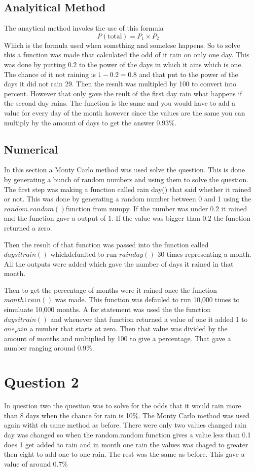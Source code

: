 \documentclass[twocolumn]{revtex4}
\begin{document}
\subsection{Analyitical Method}
The anaytical method involes the use of this formula 
$$P(\textrm{total}) = P_{\textrm{1}} \times P_{\textrm{2}} $$
Which is the formula used when something and somelese happens. 
So to solve this  a function was made that calculated the odd of it rain on only one day. This was done by putting 0.2 to the power of the days in which it ains which is one. The chance of it not raining is $1-0.2=0.8$ and that put to the power of the days it did not rain 29. Then the result was multipled by 100 to convert into percent. However that only gave the reult of the first day rain what happens if the second day rains. The function is the same and you would have to add a value for every day of the month however since the values are the same you can multiply by the amount of days to get the answer 0.93$\%$. 

\subsection{Numerical}
In this section a Monty Carlo method was used solve the question. This is done by generating a bunch of random numbers and using them to solve the question. The first step was making a function called rain day() that said whether it rained or not. This was done by generating a random number between 0 and 1 using the$ random.random() $function from numpy. If the number was under 0.2 it rained and the function gave a output of 1. If the value was bigger than 0.2 the function returned a zero.

Then the result of that function was passed into the function called $ daysitrain()$ whichdefualted to run $  rainday() $ 30 times representing a month. All the outputs were added which gave the number of days it rained in that month. 

Then to get the percentage of months were it rained once the function $month1rain()$ was made. This function was defauled to run 10,000 times to simuluate 10,000 months. A for statement was used the  the function$ daysitrain()$ and whenever that function returned a value of one it added 1 to $ one_rain$  a number that starts at zero. Then that value was divided by the amount of months and multiplied by 100 to give a percentage. That gave a number ranging around 0.9$\%$.
\section{Question 2}
In question two the question was to solve for  the odds that it would rain more than 8 days when the chance for rain is 10$\%$. 
The Monty Carlo method was used again witht eh same method as before. There were only two values changed rain day was changed so when the random.random function gives a value less than 0.1 does 1 get added to rain and in month one rain the values was chaged to greater then eight to add one to one rain. The rest was the same as before. This gave a value of around 0.7$\%$
\end{document}

